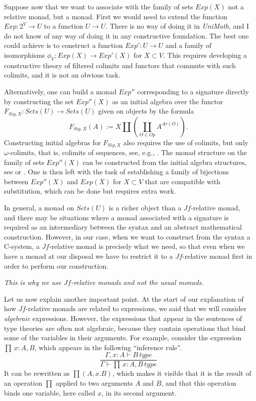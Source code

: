 \documentclass[onecolumn,12pt]{amsart}
\numberwithin{proposition}{subsection}
\newcommand{\sr}{\rightarrow}
\begin{document}
Suppose now that we want to associate with the family of sets $Exp(X)$ not a
relative monad, but a monad. First we would need to extend the function
$Exp:2^V\sr U$ to a function $U\sr U$. There is no way of doing it in
{\em UniMath}, and I do not know of any way of doing it in any constructive
foundation. The best one could achieve is to construct a function $Exp':U\sr U$
and a family of isomorphisms $\phi_V:Exp(X)\sr Exp'(X)$ for $X\subset V$. This
requires developing a constructive theory of filtered colimits and functors
that commute with such colimits, and it is not an obvious task.

Alternatively, one can build a monad $Exp''$ corresponding to a signature
directly by constructing the set $Exp''(X)$ as an initial algebra over the
functor $F_{Sig,X}:Sets(U)\sr Sets(U)$ given on objects by the formula
%
$$F_{Sig,X}(A):=X\coprod(\coprod_{O\in Op}A^{Ar(O)}).$$
%
Constructing initial algebras for $F_{Sig,X}$ also requires the use of
colimits, but only $\omega$-colimits, that is, colimits of sequences, see,
e.g., \cite{Adamek1974}. The monad structure on the family of sets $Exp''(X)$
can be constructed from the initial algebra structures, see \cite{Barr1970} or
\cite[Th.3, p.~161]{MatthesUustalu}. One is then left with the task of
establishing a family of bijections between $Exp''(X)$ and $Exp(X)$ for
$X\subset V$ that are compatible with substitution, which can be done but
requires extra work.

In general, a monad on $Sets(U)$ is a richer object than a $Jf$-relative monad,
and there may be situations where a monad associated with a signature is
required as an intermediary between the syntax and an abstract mathematical
construction. However, in our case, when we want to construct from the syntax a
C-system, a $Jf$-relative monad is precisely what we need, so that even when we
have a monad at our disposal we have to restrict it to a $Jf$-relative monad
first in order to perform our construction.

{\em This is why we use $Jf$-relative monads and not the usual monads.}

Let us now explain another important point. At the start of our
explanation of how $Jf$-relative monads are related to expressions, we said
that we will consider {\em algebraic} expressions. However, the expressions
that appear in the sentences of type theories are often not algebraic, because
they contain operations that bind some of the variables in their
arguments. For example, consider the expression $\prod\,x:A,B$, which appears in
the following ``inference rule''.
%
\begin{equation}
\label{2017.03.02.eq1}
\frac{\Gamma,x:A\vdash B\,type}{\Gamma\vdash \prod\,x:A,B\,type}
\end{equation}%
%
It can be rewritten as $\prod(A,x.B)$, which makes it
visible that it is the result of an operation $\prod$ applied to two arguments
$A$ and $B$, and that this operation binds one variable, here called $x$, in its
second argument.
\end{document}
